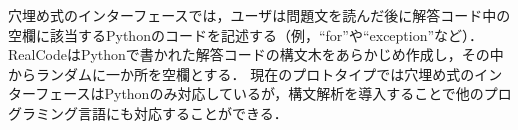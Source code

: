 穴埋め式のインターフェースでは，ユーザは問題文を読んだ後に解答コード中の空欄に該当するPythonのコードを記述する（例，``for''や``exception''など）．
RealCodeはPythonで書かれた解答コードの構文木をあらかじめ作成し，その中からランダムに一か所を空欄とする．
現在のプロトタイプでは穴埋め式のインターフェースはPythonのみ対応しているが，構文解析を導入することで他のプログラミング言語にも対応することができる．


